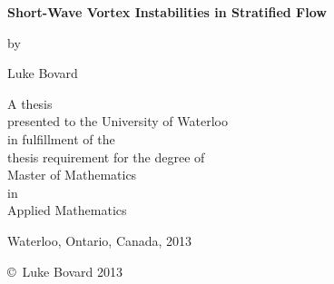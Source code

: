 \pagestyle{empty}

\begin{titlepage}
        \begin{center}
        \vspace*{1.0cm}

        \Huge
        {\bf Short-Wave Vortex Instabilities in Stratified Flow}

        \vspace*{1.0cm}

        \normalsize
        by \\

        \vspace*{1.0cm}

        \Large
        Luke Bovard \\

        \vspace*{3.0cm}

        \normalsize
        A thesis \\
        presented to the University of Waterloo \\ 
        in fulfillment of the \\
        thesis requirement for the degree of \\
        Master of Mathematics\\
        in \\
        Applied Mathematics \\

        \vspace*{2.0cm}

        Waterloo, Ontario, Canada, 2013 \\

        \vspace*{1.0cm}

        \copyright\ Luke Bovard 2013 \\
        \end{center}
\end{titlepage}

\pagestyle{plain}
\setcounter{page}{2}

